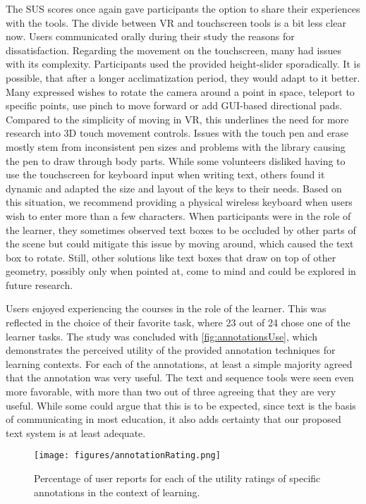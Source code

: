 The SUS scores once again gave participants the option to share their experiences with the tools. The divide between VR and touchscreen tools is a bit less clear now. Users communicated orally during their study the reasons for dissatisfaction. Regarding the movement on the touchscreen, many had issues with its complexity. Participants used the provided height-slider sporadically. It is possible, that after a longer acclimatization period, they would adapt to it better. Many expressed wishes to rotate the camera around a point in space, teleport to specific points, use pinch to move forward or add GUI-based directional pads. Compared to the simplicity of moving in VR, this underlines the need for more research into 3D touch movement controls. Issues with the touch pen and erase mostly stem from inconsistent pen sizes and problems with the library causing the pen to draw through body parts. While some volunteers disliked having to use the touchscreen for keyboard input when writing text, others found it dynamic and adapted the size and layout of the keys to their needs. Based on this situation, we recommend providing a physical wireless keyboard when users wish to enter more than a few characters. When participants were in the role of the learner, they sometimes observed text boxes to be occluded by other parts of the scene but could mitigate this issue by moving around, which caused the text box to rotate. Still, other solutions like text boxes that draw on top of other geometry, possibly only when pointed at, come to mind and could be explored in future research.

Users enjoyed experiencing the courses in the role of the learner. This was reflected in the choice of their favorite task, where 23 out of 24 chose one of the learner tasks. The study was concluded with \autoref{fig:annotationsUse}, which demonstrates the perceived utility of the provided annotation techniques for learning contexts. For each of the annotations, at least a simple majority agreed that the annotation was very useful. The text and sequence tools were seen even more favorable, with more than two out of three agreeing that they are very useful. While some could argue that this is to be expected, since text is the basis of communicating in most education, it also adds certainty that our proposed text system is at least adequate.
\begin{figure}[tb]
 \centering
 \texttt{[image: figures/annotationRating.png]}
 \caption{Percentage of user reports for each of the utility ratings of specific annotations in the context of learning.}
 \label{fig:annotationsUse}
\end{figure}


